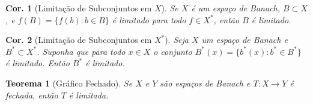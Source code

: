 \documentclass[11pt]{article}
\theoremstyle{yellowhead}
\newtheorem*{theorem}{Teorema}
\newtheorem*{corollary}{Cor.}
\theoremstyle{yellowdef}
\begin{document}
\begin{multicols}{3}
\begin{corollary}[Limitação de Subconjuntos em $X$]
Se $X$ é um espaço de Banach, $B \subset X$, e $f(B) = \{f(b): b \in B\}$ é limitado para todo $f \in X^*$, então $B$ é limitado.
\end{corollary}

\begin{corollary}[Limitação de Subconjuntos em $X^*$]
Seja $X$ um espaço de Banach e $B^* \subset X^*$. Suponha que para todo $x \in X$ o conjunto $B^*(x) = \{b^*(x): b^* \in B^*\}$ é limitado. Então $B^*$ é limitado.
\end{corollary}

\begin{theorem}[Gráfico Fechado]
Se $X$ e $Y$ são espaços de Banach e $T: X \to Y$ é fechada, então $T$ é limitada.
\end{theorem}
\end{multicols}
\newpage
\end{document}
